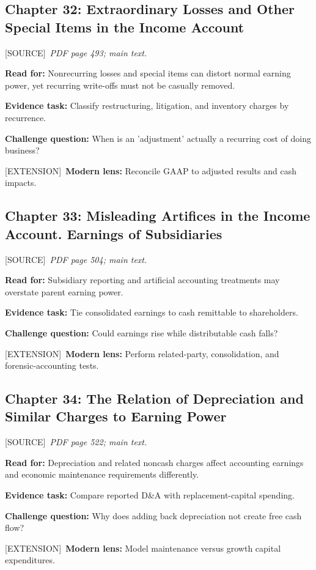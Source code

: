 \documentclass[11pt,letterpaper]{article}
\newcommand{\src}{\textsf{\color{sea}[SOURCE]}}
\newcommand{\ext}{\textsf{\color{gold}[EXTENSION]}}
\begin{document}
\subsection{Chapter 32: Extraordinary Losses and Other Special Items in the Income Account}
\src\ \textit{PDF page 493; main text.}\par
\textbf{Read for:} Nonrecurring losses and special items can distort normal earning power, yet recurring write-offs must not be casually removed.\par
\textbf{Evidence task:} Classify restructuring, litigation, and inventory charges by recurrence.\par
\textbf{Challenge question:} When is an 'adjustment' actually a recurring cost of doing business?\par
\ext\ \textbf{Modern lens:} Reconcile GAAP to adjusted results and cash impacts.\par

\subsection{Chapter 33: Misleading Artifices in the Income Account. Earnings of Subsidiaries}
\src\ \textit{PDF page 504; main text.}\par
\textbf{Read for:} Subsidiary reporting and artificial accounting treatments may overstate parent earning power.\par
\textbf{Evidence task:} Tie consolidated earnings to cash remittable to shareholders.\par
\textbf{Challenge question:} Could earnings rise while distributable cash falls?\par
\ext\ \textbf{Modern lens:} Perform related-party, consolidation, and forensic-accounting tests.\par

\subsection{Chapter 34: The Relation of Depreciation and Similar Charges to Earning Power}
\src\ \textit{PDF page 522; main text.}\par
\textbf{Read for:} Depreciation and related noncash charges affect accounting earnings and economic maintenance requirements differently.\par
\textbf{Evidence task:} Compare reported D\&A with replacement-capital spending.\par
\textbf{Challenge question:} Why does adding back depreciation not create free cash flow?\par
\ext\ \textbf{Modern lens:} Model maintenance versus growth capital expenditures.\par
\end{document}

